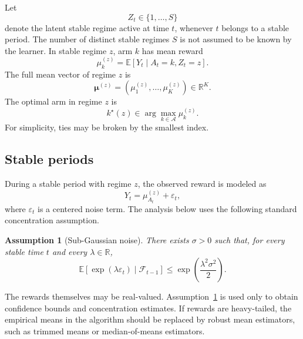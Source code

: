 \documentclass[11pt]{article}
\newtheorem{assumption}{Assumption}
\newcommand{\A}{\mathcal A}
\newcommand{\F}{\mathcal F}
\newcommand{\E}{\mathbb E}
\newcommand{\R}{\mathbb R}
\begin{document}
Let
\begin{equation}
\label{eq:latent_regime}
Z_t\in\{1,\ldots,S\}
\end{equation}
denote the latent stable regime active at time $t$, whenever $t$ belongs to a stable period. The number of distinct stable regimes $S$ is not assumed to be known by the learner. In stable regime $z$, arm $k$ has mean reward
\begin{equation}
\label{eq:regime_arm_mean}
\mu_k^{(z)}
=
\E[Y_t\mid A_t=k,Z_t=z].
\end{equation}
The full mean vector of regime $z$ is
\begin{equation}
\label{eq:regime_mean_vector}
\bm\mu^{(z)}
=
(\mu_1^{(z)},\ldots,\mu_K^{(z)})\in\R^K .
\end{equation}
The optimal arm in regime $z$ is
\begin{equation}
\label{eq:best_arm_regime}
k^\star(z)
\in
\arg\max_{k\in\A}\mu_k^{(z)}.
\end{equation}
For simplicity, ties may be broken by the smallest index.

\subsection{Stable periods}
\label{subsec:stable_periods}

During a stable period with regime $z$, the observed reward is modeled as
\begin{equation}
\label{eq:stable_reward_model}
Y_t
=
\mu_{A_t}^{(z)}+\varepsilon_t,
\end{equation}
where $\varepsilon_t$ is a centered noise term. The analysis below uses the following standard concentration assumption.

\begin{assumption}[Sub-Gaussian noise]
\label{ass:subgaussian_noise}
There exists $\sigma>0$ such that, for every stable time $t$ and every $\lambda\in\R$,
\begin{equation}
\label{eq:subgaussian_noise}
\E\left[
\exp(\lambda\varepsilon_t)
\mid
\F_{t-1}
\right]
\leq
\exp\left(\frac{\lambda^2\sigma^2}{2}\right).
\end{equation}
\end{assumption}

The rewards themselves may be real-valued. Assumption~\ref{ass:subgaussian_noise} is used only to obtain confidence bounds and concentration estimates. If rewards are heavy-tailed, the empirical means in the algorithm should be replaced by robust mean estimators, such as trimmed means or median-of-means estimators.
\end{document}
